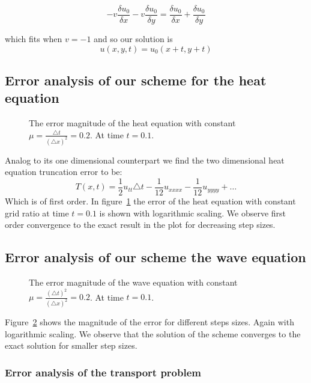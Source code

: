 \begin{equation}
-v\frac{\delta u_0}{\delta x}-v\frac{\delta u_0}{\delta y} = \frac{\delta u_0}{\delta x}+\frac{\delta u_0}{\delta y} 
\end{equation}

which fits when $v=-1$ and so our solution is
\begin{equation}
u(x,y,t)=u_0(x+t,y+t)
\end{equation}

\subsection{Error analysis of our scheme for the heat equation}
\begin{figure}

\caption{The error magnitude of the heat equation with constant $\mu = \frac{\triangle t}{(\triangle x)^2} = 0.2$. At time $t = 0.1$.}
\label{error:Heat}
\end{figure}
Analog to its one dimensional counterpart we find the two dimensional heat equation truncation error to be:
\begin{equation}
T(x,t) = \frac{1}{2} u_{tt} \triangle t - \frac{1}{12} u_{xxxx} - \frac{1}{12} u_{yyyy} + \dots
\end{equation}
Which is of first order. In figure~\ref{error:Heat} the error of the heat equation with constant grid ratio at time $t = 0.1$ is shown with logarithmic scaling. We observe first order convergence to the exact result in the plot for decreasing step sizes.

\subsection{Error analysis of our scheme the wave equation}
\begin{figure}

\caption{The error magnitude of the wave equation with constant $\mu = \frac{(\triangle t)^2}{(\triangle x)^2} = 0.2$. At time $t = 0.1$.}
\label{error:Wave}
\end{figure}
Figure~\ref{error:Wave} shows the magnitude of the error for different steps sizes. Again with logarithmic scaling. We observe that the solution of the scheme converges to the exact solution for smaller step sizes.


\subsubsection{Error analysis of the transport problem}

